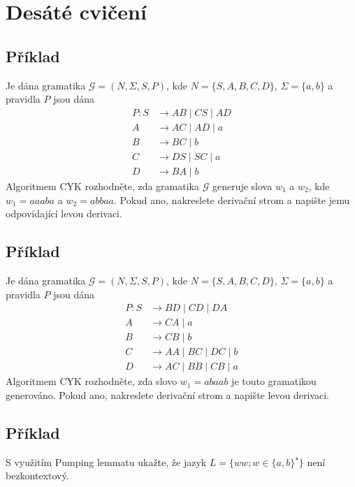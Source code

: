 \section{Desáté cvičení}

\subsection{Příklad}
Je dána gramatika $\mathcal{G} = (N, \Sigma, S, P)$, kde $N = \{S, A, B, C, D\}$, $\Sigma = \{a,b\}$ a pravidla $P$ jsou dána
\begin{align*}
    P: S &\rightarrow AB \mid CS \mid AD\\
    A &\rightarrow AC \mid AD \mid a\\
    B &\rightarrow BC \mid b\\
    C &\rightarrow DS \mid SC \mid a\\
    D &\rightarrow BA \mid b
\end{align*}
Algoritmem CYK rozhodněte, zda gramatika $\mathcal{G}$ generuje slova $w_1$ a $w_2$, kde $w_1 = aaaba$ a $w_2 = abbaa$. Pokud ano, nakreslete derivační strom a napište jemu odpovídající levou derivaci.

\subsection{Příklad}
Je dána gramatika $\mathcal{G} = (N, \Sigma, S, P)$, kde $N = \{S, A, B, C, D\}$, $\Sigma = \{a,b\}$ a pravidla $P$ jsou dána
\begin{align*}
    P: S &\rightarrow BD \mid CD \mid DA\\
    A &\rightarrow CA \mid a\\
    B &\rightarrow CB \mid b\\
    C &\rightarrow AA \mid BC \mid DC \mid b\\
    D &\rightarrow AC \mid BB \mid CB \mid a
\end{align*}
Algoritmem CYK rozhodněte, zda slovo $w_1 = abaab$ je touto gramatikou generováno. Pokud ano, nakreslete derivační strom a napište levou derivaci.

\subsection{Příklad}
S využitím Pumping lemmatu ukažte, že jazyk $L = \{ww;w \in \{a,b\}^\star\}$ není bezkontextový.

